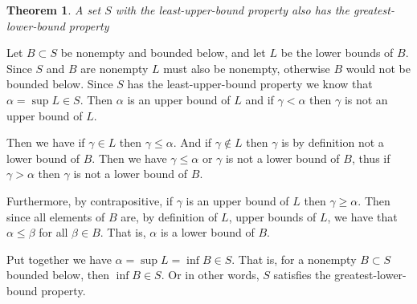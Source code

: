 \documentclass{article}
\newtheorem*{theorem*}{Theorem}
\let\endoldproof\endproof
\renewenvironment{proof}[1][\proofname]
  {\begin{adjustwidth}{2em}{2em}
   \oldproof[#1]}
  {\endoldproof
   \end{adjustwidth}}
\begin{document}
\begin{theorem*}A set $S$ with the least-upper-bound property also has the
                greatest-lower-bound property
\end{theorem*}
\begin{proof}
Let $B \subset S$ be nonempty and bounded below, and let $L$ be the lower
bounds of $B$. Since $S$ and $B$ are nonempty $L$ must also be nonempty,
otherwise $B$ would not be bounded below. Since $S$ has the least-upper-bound
property we know that $\alpha = \sup L \in S$. Then $\alpha$ is an upper bound
of $L$ and if $\gamma < \alpha$ then $\gamma$ is not an upper bound of $L$.

Then we have if $\gamma \in L$ then $\gamma \leq \alpha$. And if $\gamma
\not\in L$ then $\gamma$ is by definition not a lower bound of $B$. Then we have
$\gamma \leq \alpha$ or $\gamma$ is not a lower bound of $B$, thus if $\gamma >
\alpha$ then $\gamma$ is not a lower bound of $B$.

Furthermore, by contrapositive, if $\gamma$ is an upper bound of $L$ then
$\gamma \geq \alpha$.  Then since all elements of $B$ are, by definition of
$L$, upper bounds of $L$, we have that $\alpha \leq \beta$ for all $\beta \in
B$. That is, $\alpha$ is a lower bound of $B$.

Put together we have $\alpha = \sup L = \inf B \in S$. That is, for a nonempty
$B\subset S$ bounded below, then $\inf B \in S$. Or in other words, $S$
satisfies the greatest-lower-bound property.
\end{proof}
\end{document}
